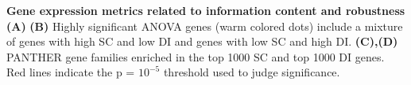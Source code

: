 \textbf{Gene expression metrics related to information content and robustness} \textbf{(A)}  \textbf{(B)} Highly significant ANOVA genes (warm colored dots) include a mixture of genes with high SC and low DI and genes with low SC and high DI. \textbf{(C),(D)} PANTHER gene families enriched in the top 1000 SC and top 1000 DI genes. Red lines indicate the p = $10^{-5}$ threshold used to judge significance.